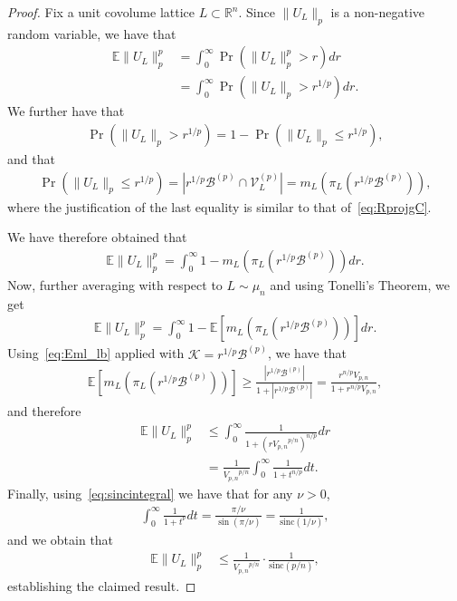 \documentclass[article,doublecolumn]{IEEEtran}
\newcommand{\EE}{{\mathbb{E}}}
\newcommand{\R}{{\mathbb{R}}}
\newcommand{\KK}{{\mathcal{K}}}
\newcommand{\mVLp}{{\mathcal{V}^{(p)}_L}}
\newcommand{\mBp}{{\mathcal{B}^{(p)}}}
\newcommand{\Vp}{{V_{p,n}}}
\newcommand{\sinc}{{\mathrm{sinc}}}
\begin{document}
\begin{proof}
Fix a unit covolume lattice $L\subset\R^n$. Since $\|U_L\|_p$ is a non-negative random variable, we have that
\begin{align}
\EE\|U_L\|^p_p&=\int_{0}^{\infty}\Pr(\|U_L\|^p_p > r)dr\\
&=\int_{0}^{\infty}\Pr(\|U_L\|_p > r^{1/p})dr. 
\label{eq:nonegativeexpectation}
\end{align}
We further have that 
\begin{align}
\Pr(\|U_L\|_p> r^{1/p})=1-\Pr(\|U_L\|_p\leq r^{1/p}),    
\end{align}
and that
\begin{align}
\Pr(\|U_L\|_p\leq r^{1/p})=|r^{1/p}\mBp\cap \mVLp|=m_L(\pi_L(r^{1/p}\mBp)),    
\end{align}
where the justification of the last equality is similar to that of~\eqref{eq:RprojgC}.  


We have therefore obtained that 
\begin{align}
\EE\|U_L\|^p_p=\int_{0}^{\infty}1-m_L(\pi_L(r^{1/p}\mBp)) dr.
\end{align}
Now, further averaging with respect to $L\sim\mu_n$ and using Tonelli's Theorem, we get
\begin{align}
\EE\|U_L\|^p_p=\int_{0}^{\infty}1-\EE[m_L(\pi_L(r^{1/p}\mBp))] dr.
\end{align}
Using~\eqref{eq:Eml_lb} applied with $\KK=r^{1/p}\mBp$, we have
that
\begin{align}
\EE[m_L(\pi_L(r^{1/p}\mBp))]\geq \frac{|r^{1/p}\mBp|}{1+|r^{1/p}\mBp|} =\frac{r^{n/p}\Vp}{1+r^{n/p}\Vp},   
\end{align}
and therefore
\begin{align}
\EE\|U_L\|^p_p&\leq \int_{0}^{\infty}\frac{1}{1+(r\Vp^{p/n})^{n/p}} dr\\
&=\frac{1}{\Vp^{p/n}}\int_{0}^{\infty}\frac{1}{1+t^{n/p}} dt.
\end{align}
Finally, using~\eqref{eq:sincintegral} we have that for any $\nu>0$,
\begin{align}
\int_{0}^{\infty}\frac{1}{1+t^\nu} dt=\frac{\pi/\nu}{\sin(\pi/\nu)}=\frac{1}{\sinc(1/\nu)},
\end{align}
and we obtain that
\begin{align}
\EE\|U_L\|^p_p&\leq \frac{1}{\Vp^{p/n}}\cdot\frac{1}{\sinc( p/n)},
\end{align}
establishing the claimed result.
\end{proof}
\end{document}
